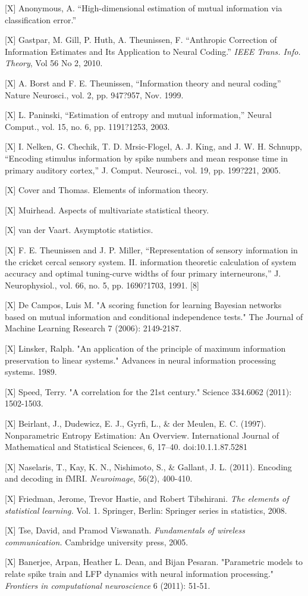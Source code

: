 \documentclass{article}
\begin{document}
\small

[X] Anonymous, A. ``High-dimensional estimation of mutual information
via classification error.''

[X] Gastpar, M.  Gill, P.  Huth, A.  Theunissen, F. ``Anthropic
Correction of Information Estimates and Its Application to Neural
Coding.'' \emph{IEEE Trans. Info. Theory}, Vol 56 No 2, 2010.

[X] A. Borst and F. E. Theunissen, ``Information theory and neural coding''
Nature Neurosci., vol. 2, pp. 947?957, Nov. 1999.

[X] L. Paninski, ``Estimation of entropy and mutual information,'' Neural
Comput., vol. 15, no. 6, pp. 1191?1253, 2003.

[X] I. Nelken, G. Chechik, T. D. Mrsic-Flogel, A. J. King, and J. W. H.
Schnupp, ``Encoding stimulus information by spike numbers and mean
response time in primary auditory cortex,'' J. Comput. Neurosci., vol.
19, pp. 199?221, 2005.

[X] Cover and Thomas.  Elements of information theory.

[X]  Muirhead.  Aspects of multivariate statistical theory.

[X] van der Vaart.  Asymptotic statistics.

[X] F. E. Theunissen and J. P. Miller, ``Representation of sensory
information in the cricket cercal sensory system. II. information
theoretic calculation of system accuracy and optimal tuning-curve
widths of four primary interneurons,'' J. Neurophysiol., vol. 66,
no. 5, pp. 1690?1703, 1991.  [8]

[X] De Campos, Luis M. "A scoring function for learning Bayesian networks
based on mutual information and conditional independence tests." The
Journal of Machine Learning Research 7 (2006): 2149-2187.

[X] Linsker, Ralph. "An application of the principle of maximum
information preservation to linear systems." Advances in neural
information processing systems. 1989.

[X] Speed, Terry. "A correlation for the 21st century." Science
334.6062 (2011): 1502-1503.

[X] Beirlant, J., Dudewicz, E. J., Gyrfi, L., \& der Meulen,
E. C. (1997). Nonparametric Entropy Estimation: An
Overview. International Journal of Mathematical and Statistical
Sciences, 6, 17–40. doi:10.1.1.87.5281

[X] Naselaris, T., Kay, K. N., Nishimoto, S., \& Gallant,
J. L. (2011). Encoding and decoding in fMRI. \emph{Neuroimage}, 56(2),
400-410.

[X] Friedman, Jerome, Trevor Hastie, and Robert Tibshirani. \emph{The elements
of statistical learning.} Vol. 1. Springer, Berlin: Springer series in
statistics, 2008.

[X] Tse, David, and Pramod Viswanath. \emph{Fundamentals of wireless
communication.} Cambridge university press, 2005.

[X] Banerjee, Arpan, Heather L. Dean, and Bijan Pesaran. "Parametric
models to relate spike train and LFP dynamics with neural information
processing." \emph{Frontiers in computational neuroscience} 6 (2011): 51-51.
\end{document}
